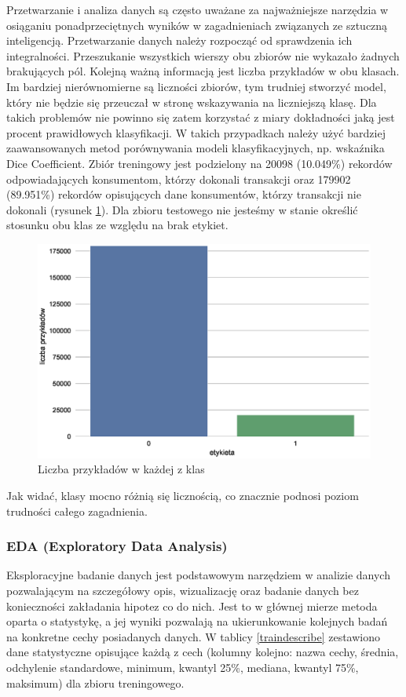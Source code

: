 \documentclass[12pt]{article}
\begin{document}
Przetwarzanie i analiza danych są często uważane za najważniejsze narzędzia w osiąganiu ponadprzeciętnych wyników w zagadnieniach związanych ze sztuczną inteligencją. Przetwarzanie danych należy rozpocząć od sprawdzenia ich integralności. Przeszukanie wszystkich wierszy obu zbiorów nie wykazało żadnych brakujących pól. Kolejną ważną informacją jest liczba przykładów w obu klasach. Im bardziej nierównomierne są liczności zbiorów, tym trudniej stworzyć model, który nie będzie się przeuczał w stronę wskazywania na liczniejszą klasę. Dla takich problemów nie powinno się zatem korzystać z miary dokładności jaką jest procent prawidłowych klasyfikacji. W takich przypadkach należy użyć bardziej zaawansowanych metod porównywania modeli klasyfikacyjnych, np. wskaźnika Dice Coefficient. Zbiór treningowy jest podzielony na 20098 (10.049\%) rekordów odpowiadających konsumentom, którzy dokonali transakcji oraz 179902 (89.951\%) rekordów opisujących dane konsumentów, którzy transakcji nie dokonali  (rysunek \ref{classescount}). Dla zbioru testowego nie jesteśmy w stanie określić stosunku obu klas ze względu na brak etykiet. 
\begin{figure}[H]
\centering \includegraphics[scale=0.7]{classes.eps}
\caption{Liczba przykładów w każdej z klas}
\label{classescount}
\end{figure}
Jak widać, klasy mocno różnią się licznością, co znacznie podnosi poziom trudności całego zagadnienia.

\subsubsection{EDA (Exploratory Data Analysis)}

Eksploracyjne badanie danych jest podstawowym narzędziem w analizie danych pozwalającym na szczegółowy opis, wizualizację oraz badanie danych bez konieczności zakładania hipotez co do nich. Jest to w głównej mierze metoda oparta o statystykę, a jej wyniki pozwalają na ukierunkowanie kolejnych badań na konkretne cechy posiadanych danych. 
\newline W tablicy \ref{traindescribe} zestawiono dane statystyczne opisujące każdą z cech (kolumny kolejno: nazwa cechy, średnia, odchylenie standardowe, minimum, kwantyl 25\%, mediana, kwantyl 75\%, maksimum) dla zbioru treningowego.
\end{document}
